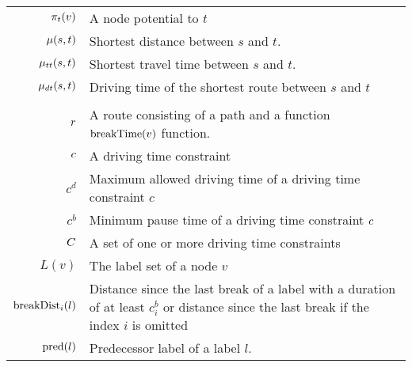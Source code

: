 \begin{tabular}{rp{}}
	$\pi_t(v)$         & A node potential to $t$                                                                                                                   \\
	$\mu(s,t)$          & Shortest distance between $s$ and $t$.                                                                                                    \\
	$\mu_{tt}(s,t)$        & Shortest travel time between $s$ and $t$.                                                                                                 \\
	$\mu_{dt}(s,t)$       & Driving time of the shortest route between $s$ and $t$                                                                                    \\
	\\
	$r$                  & A route consisting of a path and a function $\operatorname{breakTime}(v)$ function.                                                                     \\
	$c$                  & A driving time constraint                                                                                                                 \\
	$c^d$                     & Maximum allowed driving time of a driving time constraint $c$                                                                             \\
	$c^b$                     & Minimum pause time of a driving time constraint $c$                                                                                  \\
	$C$               & A set of one or more driving time constraints                                                                                             \\
	$L(v)$                    & The label set of a node $v$                                                                                                               \\
	$\operatorname{breakDist}_i(l)$         & Distance since the last break of a label with a duration of at least $c_i^b$ or distance since the last break if the index $i$ is omitted \\
	$\operatorname{pred}(l)$                & Predecessor label of a label $l$.                                                                                                         \\


\end{tabular}
